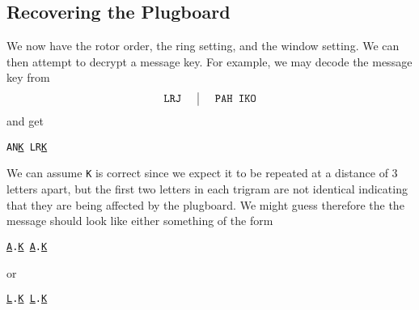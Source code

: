 \subsection{Recovering the Plugboard}
We now have the rotor order, the ring setting, and the window setting. We can then attempt to decrypt a message key. For example, we may decode the message key from
\[
	\setlength{\arraycolsep}{15pt}
	\begin{array}{c | c}
		\texttt{LRJ} & \texttt{PAH }\texttt{IKO} \\
	\end{array}
\]
and get
\begin{center}
	\texttt{AN}{\uline{\texttt{K}}}\texttt{ LR}{\uline{\texttt{K}}}
\end{center}
We can assume \texttt{K} is correct since we expect it to be repeated at a distance of 3 letters apart, but the first two letters in each trigram are not identical indicating that they are being affected by the plugboard. We might guess therefore the the message should look like either something of the form
\begin{center}
	{\uline{\texttt{A}}}\texttt{.}{\uline{\texttt{K}}}\texttt{ }{\uline{\texttt{A}}}\texttt{.}{\uline{\texttt{K}}}
\end{center}
or
\begin{center}
	{\uline{\texttt{L}}}\texttt{.}{\uline{\texttt{K}}}\texttt{ }{\uline{\texttt{L}}}\texttt{.}{\uline{\texttt{K}}}
\end{center}

